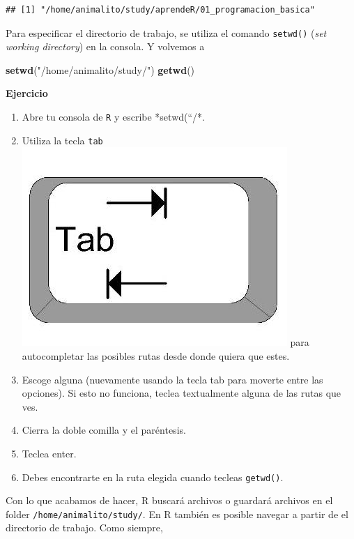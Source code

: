 \documentclass[]{article}
\newenvironment{Shaded}{\begin{snugshade}}{\end{snugshade}}
\newcommand{\KeywordTok}[1]{\textcolor[rgb]{0.13,0.29,0.53}{\textbf{#1}}}
\newcommand{\StringTok}[1]{\textcolor[rgb]{0.31,0.60,0.02}{#1}}
\newcommand{\NormalTok}[1]{#1}
\providecommand{\tightlist}{%
  \setlength{\itemsep}{0pt}\setlength{\parskip}{0pt}}
\begin{document}
\begin{verbatim}
## [1] "/home/animalito/study/aprendeR/01_programacion_basica"
\end{verbatim}

Para especificar el directorio de trabajo, se utiliza el comando
\texttt{setwd()} (\emph{set working directory}) en la consola. Y
volvemos a

\begin{Shaded}
\begin{Highlighting}[]
\KeywordTok{setwd}\NormalTok{(}\StringTok{"/home/animalito/study/"}\NormalTok{)}
\KeywordTok{getwd}\NormalTok{()}
\end{Highlighting}
\end{Shaded}

\textbf{Ejercicio}

\begin{enumerate}
\def\labelenumi{\arabic{enumi}.}
\tightlist
\item
  Abre tu consola de \texttt{R} y escribe *setwd(``/*.
\item
  Utiliza la tecla \texttt{tab}
  \includegraphics[scale=0.5]{../img/tab_key.jpg} para autocompletar las
  posibles rutas desde donde quiera que estes.
\item
  Escoge alguna (nuevamente usando la tecla tab para moverte entre las
  opciones). Si esto no funciona, teclea textualmente alguna de las
  rutas que ves.
\item
  Cierra la doble comilla y el paréntesis.
\item
  Teclea enter.
\item
  Debes encontrarte en la ruta elegida cuando tecleas \texttt{getwd()}.
\end{enumerate}

Con lo que acabamos de hacer, R buscará archivos o guardará archivos en
el folder \texttt{/home/animalito/study/}. En R también es posible
navegar a partir de el directorio de trabajo. Como siempre,
\end{document}
